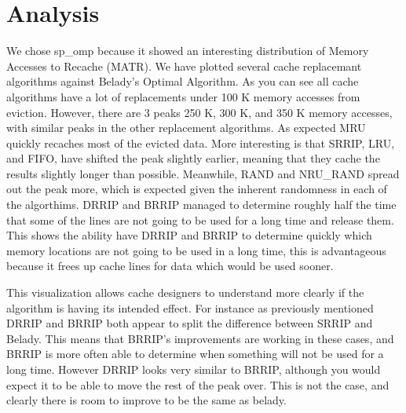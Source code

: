 \section{Analysis}

We chose sp\_omp because it showed an interesting distribution of Memory Accesses to Recache (MATR).
	We have plotted several cache replacemant algorithms against Belady's Optimal Algorithm.
	As you can see all cache algorithms have a lot of replacements under 100 K memory accesses from eviction.
	However, there are 3 peaks 250 K, 300 K, and 350 K memory accesses, with similar peaks in the other replacement algorithms.
	As expected MRU quickly recaches most of the evicted data.
	More interesting is that SRRIP, LRU, and FIFO, have shifted the peak slightly earlier, meaning that they cache the results slightly longer than possible.
	Meanwhile, RAND and NRU\_RAND spread out the peak more, which is expected given the inherent randomness in each of the algorthims.
	DRRIP and BRRIP managed to determine roughly half the time that some of the lines are not going to be used for a long time and release them.
	This shows the ability have DRRIP and BRRIP to determine quickly which memory locations are not going to be used in a long time,
		this is advantageous because it frees up cache lines for data which would be used sooner.

This visualization allows cache designers to understand more clearly if the algorithm is having its intended effect.
	For instance as previously mentioned DRRIP and BRRIP both appear to split the difference between SRRIP and Belady.
	This means that BRRIP's improvements are working in these cases, and BRRIP is more often able to determine when something will not be used for a long time.
	However DRRIP looks very similar to BRRIP, although you would expect it to be able to move the rest of the peak over.
	This is not the case, and clearly there is room to improve to be the same as belady.

